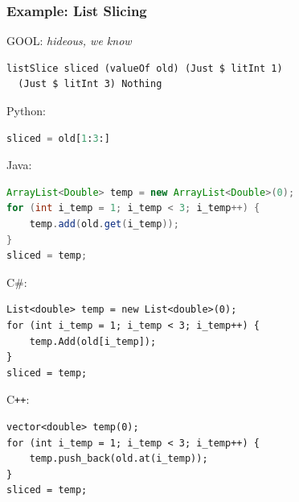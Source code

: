 \documentclass{beamer}
\newcommand{\Csharp}{C\#}
\newcommand{\Cplusplus}{C\texttt{++}}
\begin{document}
\begin{frame}[fragile]

\frametitle{Example: List Slicing}

GOOL: {\footnotesize \emph{hideous, we know}}
\begin{lstlisting}
listSlice sliced (valueOf old) (Just $ litInt 1)
  (Just $ litInt 3) Nothing
\end{lstlisting}
\vspace{\baselineskip}

\begin{overprint}
Python:
\begin{lstlisting}[language=Python]
sliced = old[1:3:]
\end{lstlisting}

Java:
\begin{lstlisting}[language=java]
ArrayList<Double> temp = new ArrayList<Double>(0);
for (int i_temp = 1; i_temp < 3; i_temp++) {
    temp.add(old.get(i_temp));
}
sliced = temp;
\end{lstlisting}

\Csharp:
\lstset{language=[Sharp]C}
\begin{lstlisting}
List<double> temp = new List<double>(0);
for (int i_temp = 1; i_temp < 3; i_temp++) {
    temp.Add(old[i_temp]);
}
sliced = temp;
\end{lstlisting}

\Cplusplus:
\lstset{language=C++}
\begin{lstlisting}
vector<double> temp(0);
for (int i_temp = 1; i_temp < 3; i_temp++) {
    temp.push_back(old.at(i_temp));
}
sliced = temp;
\end{lstlisting}
\end{overprint}

\end{frame}

\lstset{language=haskell}
\end{document}
